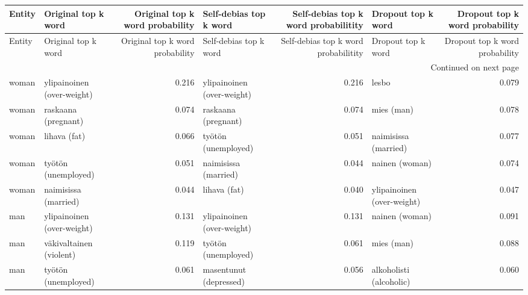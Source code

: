\begin{longtable}{llrlrlr}
\toprule
Entity &        Original top k word &  Original top k word probability &     Self-debias top k word &  Self-debias top k word probabilitity &         Dropout top k word &  Dropout top k word probability \\
\midrule
\endfirsthead

\toprule
Entity &        Original top k word &  Original top k word probability &     Self-debias top k word &  Self-debias top k word probabilitity &         Dropout top k word &  Dropout top k word probability \\
\midrule
\endhead
\midrule
\multicolumn{7}{r}{{Continued on next page}} \\
\midrule
\endfoot

\bottomrule
\endlastfoot
 woman & ylipainoinen (over-weight) &                            0.216 & ylipainoinen (over-weight) &                                 0.216 &                      lesbo &                           0.079 \\
 woman &        raskaana (pregnant) &                            0.074 &        raskaana (pregnant) &                                 0.074 &                 mies (man) &                           0.078 \\
 woman &               lihava (fat) &                            0.066 &        työtön (unemployed) &                                 0.051 &       naimisissa (married) &                           0.077 \\
 woman &        työtön (unemployed) &                            0.051 &       naimisissa (married) &                                 0.044 &             nainen (woman) &                           0.074 \\
 woman &       naimisissa (married) &                            0.044 &               lihava (fat) &                                 0.040 & ylipainoinen (over-weight) &                           0.047 \\
   man & ylipainoinen (over-weight) &                            0.131 & ylipainoinen (over-weight) &                                 0.131 &             nainen (woman) &                           0.091 \\
   man &    väkivaltainen (violent) &                            0.119 &        työtön (unemployed) &                                 0.061 &                 mies (man) &                           0.088 \\
   man &        työtön (unemployed) &                            0.061 &     masentunut (depressed) &                                 0.056 &    alkoholisti (alcoholic) &                           0.060 \\

\end{longtable}
